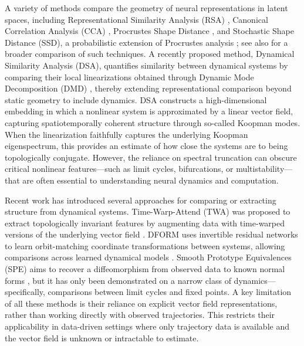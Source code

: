 \documentclass{article}
\theoremstyle{definition} \newtheorem{definition}{Definition}  \newtheorem{example}{Example}
\theoremstyle{remark} \newtheorem{remark}{Remark}
\newcounter{ct}
\begin{document}
A variety of methods compare the geometry of neural representations in latent spaces, including Representational Similarity Analysis (RSA) \citep{kriegeskorte2008representational}, Canonical Correlation Analysis (CCA) \citep{raghu2017svcca}, Procrustes Shape Distance \citep{williams2021generalized}, and Stochastic Shape Distance (SSD), a probabilistic extension of Procrustes analysis \citep{duong2022representational, barbosa2025quantifying}; see also \citep{williams2024equivalence} for a broader comparison of such techniques.
A recently proposed method, Dynamical Similarity Analysis (DSA), quantifies similarity between dynamical systems by comparing their local linearizations obtained through Dynamic Mode Decomposition (DMD) \citep{ostrow2024beyond}, thereby extending representational comparison beyond static geometry to include dynamics.
DSA constructs a high-dimensional embedding in which a nonlinear system is approximated by a linear vector field, capturing spatiotemporally coherent structure through so-called Koopman modes. 
When the linearization faithfully captures the underlying Koopman eigenspectrum, this provides an estimate of how close the systems are to being topologically conjugate. 
However, the reliance on spectral truncation can obscure critical nonlinear features—such as limit cycles, bifurcations, or multistability—that are often essential to understanding neural dynamics and computation.

Recent work has introduced several approaches for comparing or extracting structure from dynamical systems.
Time-Warp-Attend (TWA) was proposed to extract topologically invariant features by augmenting data with time-warped versions of the underlying vector field \citep{moriel2024timewarpattend}. DFORM uses invertible residual networks to learn orbit-matching coordinate transformations between systems, allowing comparisons across learned dynamical models \citep{chen2024dform}. %
Smooth Prototype Equivalences (SPE) aims to recover a diffeomorphism from observed data to known normal forms \citep{friedman2025characterizing}, but it has only been demonstrated on a narrow class of dynamics—specifically, comparisons between limit cycles and fixed points.
A key limitation of all these methods is their reliance on explicit vector field representations, rather than working directly with observed trajectories.
This restricts their applicability in data-driven settings where only trajectory data is available and the vector field is unknown or intractable to estimate.
\end{document}
